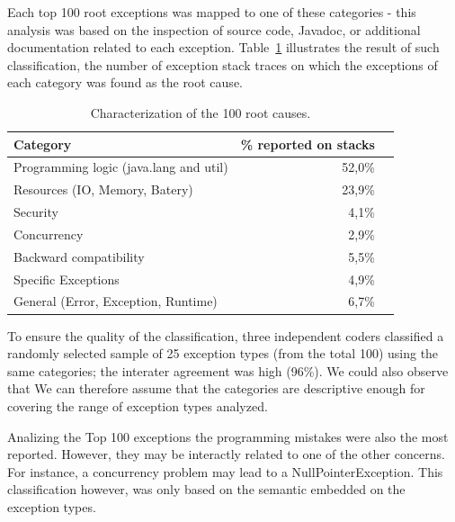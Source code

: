\documentclass[conference]{IEEEtran}
\begin{document}
Each top 100 root exceptions was mapped to one of these categories - 
this analysis was based on the inspection of source code, Javadoc, or additional 
documentation related to each exception.  Table~\ref{tab:tophundrend} 
illustrates the result of such classification, the number of exception stack traces
on which the exceptions of each category was found as the root cause.

\begin{table}
  \centering
  \begin{tabular}{lrr}
    \hline
    \bfseries{Category} &  \bfseries{\% reported on stacks} \\
    \hline
      Programming logic (java.lang and util) &  52,0\%\\ 
      Resources (IO, Memory, Batery)       &   23,9\% \\ 
      Security                               &  4,1\%\\  
      Concurrency                            &  2,9\% \\ 
      Backward compatibility                 & 5,5\% \\ 
      Specific Exceptions               &  4,9\%\\ 
      General (Error, Exception, Runtime)    &  6,7\%\\
  \end{tabular}
  \caption{Characterization of the 100 root causes.}
  \label{tab:tophundrend}
\end{table}

To ensure the quality of the classification, three independent coders classified a randomly selected
sample of 25 exception types (from the total 100) using the same categories;
the interater agreement was high (96\%). We could also observe that
We can therefore assume that the categories are descriptive 
enough for covering the range of exception types analyzed.

Analizing the Top 100 exceptions the programming mistakes
were also the most reported. However, they may be interactly related 
to one of the other concerns. For  instance, a concurrency problem may 
lead to a NullPointerException. This classification however, 
was only based on the semantic embedded  on the exception types.

\noindent {}
\end{document}
